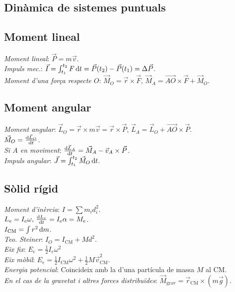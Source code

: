 \documentclass[11pt]{article}
\newcommand{\lp}{\left(}
\newcommand{\rp}{\right)}
\newcommand{\ci}{\textbullet\;}
\begin{document}
\begin{multicols}{4}
\section{Din\`amica de sistemes puntuals}

\subsection{Moment lineal}
\emph{Moment lineal}: $\vec{P} = m\vec{v}$. \\
\emph{Impuls mec.}: $\vec{I} = \int_{t_1}^{t_2} F \dif t = \vec{P}(t_2) - \vec{P}(t_1) = \Delta\vec{P}$. \\
\emph{Moment d'una força respecte $O$}: $\vec{M}_O = \vec{r}\times\vec{F}$, $\vec{M}_A = \vec{AO}\times\vec{F} + \vec{M}_O$.

\subsection{Moment angular}
\emph{Moment angular}: $\vec{L}_O = \vec{r}\times m\vec{v} = \vec{r}\times\vec{P}$, $\vec{L}_A = \vec{L}_O + \vec{AO}\times\vec{P}$. \\
\ci $\vec{M}_O = \frac{\dif \vec{L}_O}{\dif t}$. \\
\emph{Si $A$ en moviment}: $\frac{\dif \vec{L}_A}{\dif t} = \vec{M}_A - \vec{v}_A\times\vec{P}$.\\
\emph{Impuls angular}: $\vec{J} = \int_{t_1}^{t_2} \vec{M}_O\dif t$.

\subsection{Sòlid rígid}
\emph{Moment d'inèrcia}: $I = \sum m_i d_i^2$. \\
\ci $L_e = I_e\omega,\, \frac{\dif L_e}{\dif t} = I_e\alpha = M_e$. \\
\ci $I_{\text{CM}} = \int r^2 \dif m$. \\
\emph{Teo. Steiner}: $I_O = I_{\text{CM}} + Md^2$. \\
\emph{Eix fix}: $E_\text{c} = \frac{1}{2} I_e \omega^2 $\\
\emph{Eix mòbil}: $E_{\text{c}} = \frac{1}{2} I_\text{CM}\omega^2 + \frac{1}{2}  M\vec{v}_{\text{CM}}^2$.\\
\emph{Energia potencial}: Coincideix amb la d'una partícula de massa $M$ al CM.\\
\emph{En el cas de la gravetat i altres forces distribuïdes}: $\vec{M}_\text{grav}
  = \vec{r}_\text{CM} \times \lp m \vec{g} \rp$.


\end{multicols}
\end{document}
